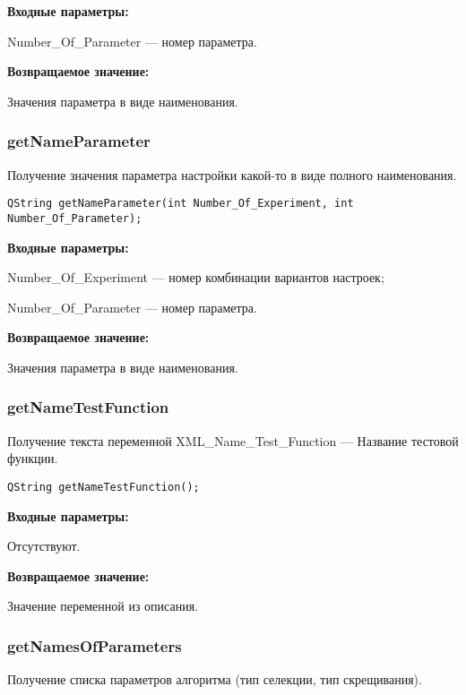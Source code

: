 \documentclass[a4paper,12pt]{article}
\begin{document}
\textbf{Входные параметры:}

Number\_Of\_Parameter --- номер параметра.

\textbf{Возвращаемое значение:}

Значения параметра в виде наименования.


\subsubsection{getNameParameter}\label{getNameParameter}

Получение значения параметра настройки какой-то в виде полного наименования.


\begin{lstlisting}[label=code_syntax_getNameParameter,caption=Синтаксис]
QString getNameParameter(int Number_Of_Experiment, int Number_Of_Parameter);
\end{lstlisting}

\textbf{Входные параметры:}

Number\_Of\_Experiment --- номер комбинации вариантов настроек;

Number\_Of\_Parameter --- номер параметра.

\textbf{Возвращаемое значение:}

Значения параметра в виде наименования.


\subsubsection{getNameTestFunction}\label{getNameTestFunction}

Получение текста переменной  XML\_Name\_Test\_Function --- Название тестовой функции.


\begin{lstlisting}[label=code_syntax_getNameTestFunction,caption=Синтаксис]
QString getNameTestFunction();
\end{lstlisting}

\textbf{Входные параметры:}

Отсутствуют.

\textbf{Возвращаемое значение:}

Значение переменной из описания.


\subsubsection{getNamesOfParameters}\label{getNamesOfParameters}

Получение списка параметров алгоритма (тип селекции, тип скрещивания).
\end{document}
